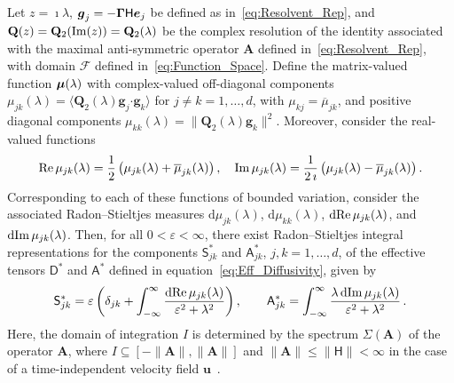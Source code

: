 \documentclass[leqno,onefignum,onetabnum]{siamltex1213}
\renewcommand{\d}{\mathrm{d}}
\newcommand{\Ab}{\mathbf{A}}
\newcommand{\Qb}{\mathbf{Q}}
\newcommand{\Fc}{\mathcal{F}}
\newcommand{\Dm}{\mathsf{D}}
\newcommand{\Hm}{\mathsf{H}}
\newcommand{\Sm}{\mathsf{S}}
\newcommand{\Am}{\mathsf{A}}
\newcommand\bmu{\mbox{\boldmath${\mu}$}}
\newcommand\bGamma{\mbox{\boldmath${\Gamma}$}}
\providecommand\bcdot{\boldsymbol{\cdot}}
\newcommand{\vecg}{\boldsymbol{g}}
\newcommand{\vecu}{\boldsymbol{u}}
\newcommand{\vece}{\boldsymbol{e}}
\begin{document}
\begin{theorem}%
%
Let $z=\imath\lambda$, $\vecg_j=-\bGamma\Hm\vece _j$ be defined as
in~\eqref{eq:Resolvent_Rep}, and $\Qb(z)=\Qb_2({\rm Im}(z))=\Qb_2(\lambda)$
be  
the complex resolution of the identity associated with the maximal
anti-symmetric operator $\Ab$ defined in~\eqref{eq:Resolvent_Rep}, with
domain $\Fc$ defined in~\eqref{eq:Function_Space}. Define the
matrix-valued function $\bmu(\lambda)$ with complex-valued off-diagonal
components $\mu_{jk}(\lambda)=\langle\Qb_2(\lambda)\vecg_j\bcdot\vecg_k\rangle$ for $j\neq k=1,\ldots,d$,
with $\mu_{kj}=\overline{\mu}_{jk}$, and positive diagonal components
$\mu_{kk}(\lambda)=\|\Qb_2(\lambda)\vecg_k\|^2$.  Moreover, consider the real-valued
functions   
%
\begin{align}%
  {\rm Re}\,\mu_{jk}(\lambda)
         =\frac{1}{2}\left(\mu_{jk}(\lambda)+\overline{\mu}_{jk}(\lambda)\right), \quad
  {\rm Im}\,\mu_{jk}(\lambda)
         =\frac{1}{2\,\imath}\left(\mu_{jk}(\lambda)-\overline{\mu}_{jk}(\lambda)\right).
\end{align}
%
Corresponding to each of these functions of bounded variation, 
consider the associated 
Radon--Stieltjes measures $\d\mu_{jk}(\lambda)$, $\d\mu_{kk}(\lambda)$, $\d{\rm
  Re}\,\mu_{jk}(\lambda)$, and $\d{\rm Im}\,\mu_{jk}(\lambda)$. Then, for all $0<\varepsilon<\infty$,
there exist Radon--Stieltjes integral representations for the
components $\Sm^*_{jk}$ and $\Am^*_{jk}$, $j,k=1,\ldots,d$, of the effective
tensors $\Dm^*$ and $\Am^*$ defined in
equation~\eqref{eq:Eff_Diffusivity}, given by           
%
\begin{align}%
  \Sm^*_{jk}=\varepsilon\left(\delta_{jk}+\int_{-\infty}^\infty\frac{\d{\rm Re}\,\mu_{jk}(\lambda)}{\varepsilon^2+\lambda^2}\right),
  \qquad
  \Am^*_{jk}=\int_{-\infty}^\infty\frac{\lambda\,\d{\rm Im}\,\mu_{jk}(\lambda)}{\varepsilon^2+\lambda^2}\,.       
\end{align}
%
Here, the domain of integration $I$ is determined by the spectrum
$\Sigma(\Ab)$ of the operator $\Ab$, where $I\subseteq[-\|\Ab\|,\|\Ab\|]$ and
$\|\Ab\|\leq\|\Hm\|<\infty$ in the case of a time-independent velocity field
$\vecu $~\cite{Reed-1980}.     
%
\end{theorem}
\end{document}
